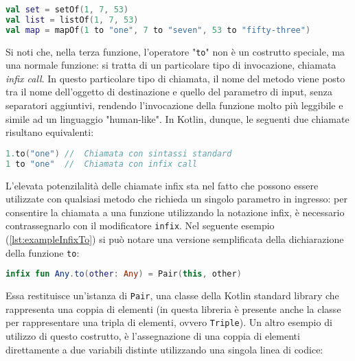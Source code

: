 \begin{lstlisting}[caption={Funzioni di libreria per le collezioni}, captionpos=b, label={lst:exampleCollections}, language=Kotlin]
val set = setOf(1, 7, 53)
val list = listOf(1, 7, 53)
val map = mapOf(1 to "one", 7 to "seven", 53 to "fifty-three")
\end{lstlisting}

Si noti che, nella terza funzione, l’operatore "\texttt{to}" non è un costrutto speciale, ma una normale funzione: si tratta di un particolare tipo di invocazione, chiamata {\em infix call}. In questo particolare tipo di chiamata, il nome del metodo viene posto tra il nome dell'oggetto di destinazione e quello del parametro di input, senza separatori aggiuntivi, rendendo l’invocazione della funzione molto più leggibile e simile ad un linguaggio "human-like". In Kotlin, dunque, le seguenti due chiamate risultano equivalenti:\\

\begin{lstlisting}[caption={La sintassi di una infix call}, captionpos=b, label={lst:exampleInfix}, language=Kotlin]
1.to("one") //  Chiamata con sintassi standard
1 to "one"  //  Chiamata con infix call
\end{lstlisting}

L'elevata potenzilalità delle chiamate infix sta nel fatto che possono essere utilizzate con qualsiasi metodo che richieda un singolo parametro in ingresso: per consentire la chiamata a una funzione utilizzando la notazione infix, è necessario contrassegnarlo con il modificatore \texttt{infix}. Nel seguente esempio (\ref{lst:exampleInfixTo}) si può notare una versione semplificata della dichiarazione della funzione \texttt{to}:\\

\begin{lstlisting}[caption={Definizione della funzione \texttt{to}}, captionpos=b, label={lst:exampleInfixTo}, language=Kotlin]
infix fun Any.to(other: Any) = Pair(this, other)
\end{lstlisting}

Essa restituisce un'istanza di \texttt{Pair}, una classe della Kotlin standard library che rappresenta una coppia di elementi (in questa libreria è presente anche la classe per rappresentare una tripla di elementi, ovvero \texttt{Triple}). Un altro esempio di utilizzo di questo costrutto, è l'assegnazione di una coppia di elementi direttamente a due variabili distinte utilizzando una singola linea di codice:\\

